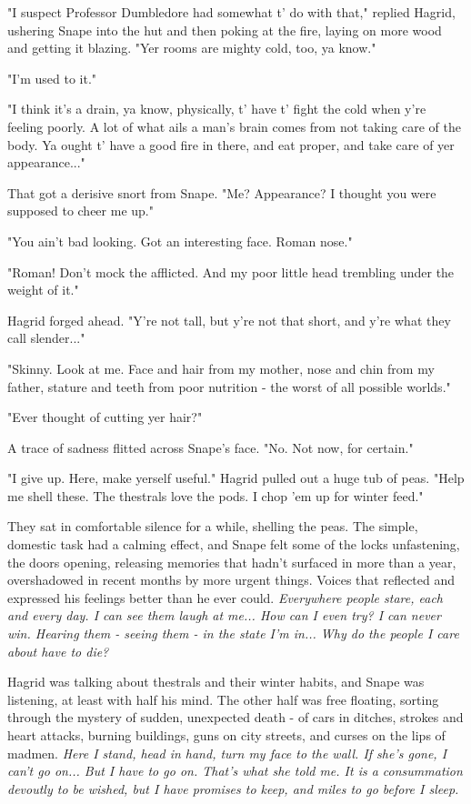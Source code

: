 "I suspect Professor Dumbledore had somewhat t' do with that," replied Hagrid, ushering Snape into the hut and then poking at the fire, laying on more wood and getting it blazing. "Yer rooms are mighty cold, too, ya know."

"I'm used to it."

"I think it's a drain, ya know, physically, t' have t' fight the cold when y're feeling poorly. A lot of what ails a man's brain comes from not taking care of the body. Ya ought t' have a good fire in there, and eat proper, and take care of yer appearance..."

That got a derisive snort from Snape. "Me? Appearance? I thought you were supposed to cheer me up."

"You ain't bad looking. Got an interesting face. Roman nose."

"Roman! Don't mock the afflicted. And my poor little head trembling under the weight of it."

Hagrid forged ahead. "Y're not tall, but y're not that short, and y're what they call slender..."

"Skinny. Look at me. Face and hair from my mother, nose and chin from my father, stature and teeth from poor nutrition - the worst of all possible worlds."

"Ever thought of cutting yer hair?"

A trace of sadness flitted across Snape's face. "No. Not now, for certain."

"I give up. Here, make yerself useful." Hagrid pulled out a huge tub of peas. "Help me shell these. The thestrals love the pods. I chop 'em up for winter feed."

They sat in comfortable silence for a while, shelling the peas. The simple, domestic task had a calming effect, and Snape felt some of the locks unfastening, the doors opening, releasing memories that hadn't surfaced in more than a year, overshadowed in recent months by more urgent things. Voices that reflected and expressed his feelings better than he ever could. \emph{Everywhere people stare, each and every day. I can see them laugh at me... How can I even try? I can never win. Hearing them - seeing them - in the state I'm in... Why do the people I care about have to die?}

Hagrid was talking about thestrals and their winter habits, and Snape was listening, at least with half his mind. The other half was free floating, sorting through the mystery of sudden, unexpected death - of cars in ditches, strokes and heart attacks, burning buildings, guns on city streets, and curses on the lips of madmen. \emph{Here I stand, head in hand, turn my face to the wall. If she's gone, I can't go on... But I have to go on. That's what she told me. It is a consummation devoutly to be wished, but I have promises to keep, and miles to go before I sleep.}

